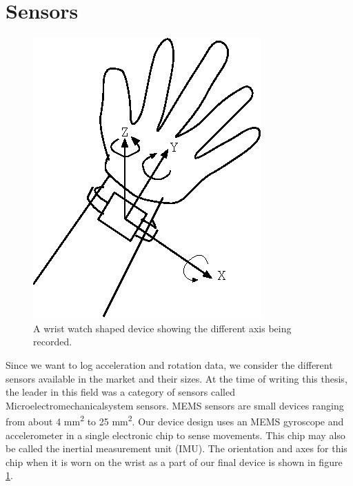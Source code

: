 \section{Sensors}
\begin{figure}
\begin{center}
\includegraphics{images/HandAxis.eps}
\caption{A wrist watch shaped device showing the different axis being recorded.}
\label{fig:HandAxis}
\end{center}
\end{figure}
Since we want to log acceleration and rotation data,
we consider the different sensors available in the market and their sizes.
At the time of writing this thesis, the leader in this field was a category of sensors called Microelectromechanicalsystem sensors.
MEMS sensors are small devices
ranging from about 4 mm\textsuperscript{2} to  25 mm\textsuperscript{2}.
Our device design uses an MEMS gyroscope and accelerometer in a single electronic chip to sense movements.
This chip may also be called the inertial measurement unit (IMU).
The orientation and axes for this chip when
it is worn on the wrist as a part of our final device is shown in figure \ref{fig:HandAxis}.

